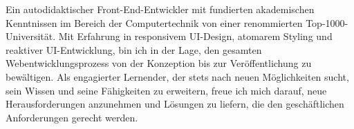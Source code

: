
\begin{cvparagraph}
Ein autodidaktischer Front-End-Entwickler mit fundierten akademischen Kenntnissen 
im Bereich der Computertechnik von einer renommierten Top-1000-Universität.
Mit Erfahrung in responsivem UI-Design, atomarem Styling und reaktiver UI-Entwicklung,
bin ich in der Lage, den gesamten Webentwicklungsprozess von 
der Konzeption bis zur Veröffentlichung zu bewältigen.
\newline
Als engagierter Lernender, der stets nach neuen Möglichkeiten sucht, 
sein Wissen und seine Fähigkeiten zu erweitern,
freue ich mich darauf, neue Herausforderungen anzunehmen und Lösungen zu liefern, 
die den geschäftlichen Anforderungen gerecht werden.
\end{cvparagraph}
